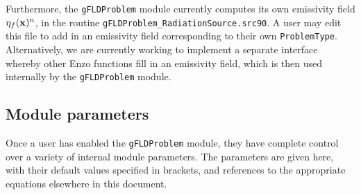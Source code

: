 \documentclass[letterpaper,10pt]{article}
\renewcommand{\(}{\left(}
\renewcommand{\)}{\right)}
\newcommand{\xvec}{{\bf x}}
\begin{document}
Furthermore, the {\tt gFLDProblem} module currently computes its own
emissivity field $\eta_f(\xvec)^n$, in the routine 
{\tt gFLDProblem\_RadiationSource.src90}.  A user may edit this file
to add in an emissivity field corresponding to their own 
{\tt ProblemType}.  Alternatively, we are currently working to
implement a separate interface whereby other Enzo functions fill
in an emissivity field, which is then used internally by the 
{\tt gFLDProblem} module.



\subsection{Module parameters}

Once a user has enabled the {\tt gFLDProblem} module, they have
complete control over a variety of internal module parameters.  The
parameters are given here, with their default values specified in
brackets, and references to the appropriate equations elsewhere in
this document. 
\end{document}
